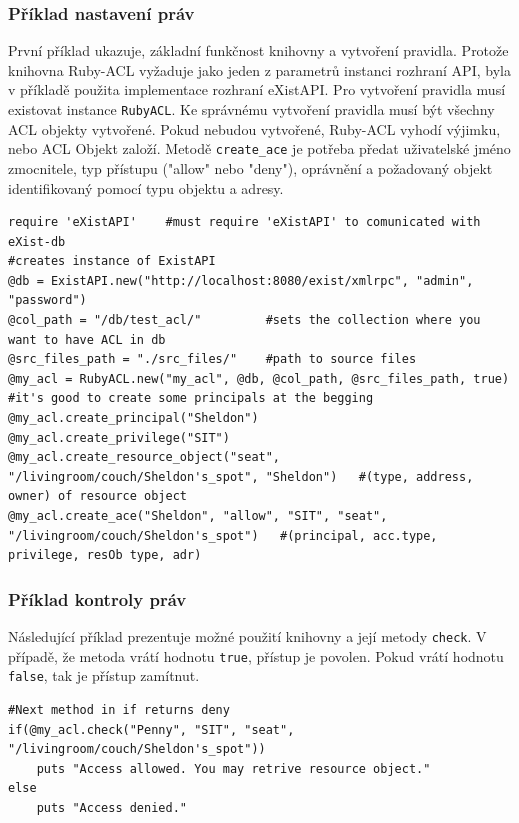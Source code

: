 
\subsubsection{Příklad nastavení práv}
První příklad ukazuje, základní funkčnost knihovny a vytvoření pravidla. 
Protože knihovna Ruby-ACL vyžaduje jako jeden z parametrů instanci rozhraní API, byla v příkladě použita implementace rozhraní eXistAPI. Pro vytvoření pravidla musí existovat instance \verb|RubyACL|. Ke správnému vytvoření pravidla musí být všechny ACL objekty vytvořené. Pokud nebudou vytvořené, Ruby-ACL vyhodí výjimku, nebo ACL Objekt založí. Metodě \verb|create_ace| je potřeba předat uživatelské jméno zmocnitele, typ přístupu ("allow" nebo "deny"), oprávnění a požadovaný objekt identifikovaný pomocí typu objektu a adresy.
\\
\begin{lstlisting}
require 'eXistAPI'    #must require 'eXistAPI' to comunicated with eXist-db
#creates instance of ExistAPI
@db = ExistAPI.new("http://localhost:8080/exist/xmlrpc", "admin", "password")    
@col_path = "/db/test_acl/"         #sets the collection where you want to have ACL in db
@src_files_path = "./src_files/"    #path to source files
@my_acl = RubyACL.new("my_acl", @db, @col_path, @src_files_path, true)
#it's good to create some principals at the begging
@my_acl.create_principal("Sheldon")
@my_acl.create_privilege("SIT")
@my_acl.create_resource_object("seat", "/livingroom/couch/Sheldon's_spot", "Sheldon")	#(type, address, owner) of resource object
@my_acl.create_ace("Sheldon", "allow", "SIT", "seat", "/livingroom/couch/Sheldon's_spot")	#(principal, acc.type, privilege, resOb type, adr)
\end{lstlisting}


\subsubsection{Příklad kontroly práv}
Následující příklad prezentuje možné použití knihovny a její metody \verb|check|. V případě, že metoda vrátí hodnotu \verb|true|, přístup je povolen. Pokud vrátí hodnotu \verb|false|, tak je přístup zamítnut. 
\\
\begin{lstlisting}[firstnumber=12]
#Next method in if returns deny
if(@my_acl.check("Penny", "SIT", "seat", "/livingroom/couch/Sheldon's_spot"))
	puts "Access allowed. You may retrive resource object."
else
	puts "Access denied."
\end{lstlisting}

